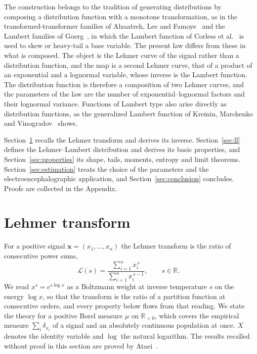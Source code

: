 \documentclass[sn-mathphys-num]{sn-jnl}\newcommand{\SNJNL}{}
\theoremstyle{thmstyleone}
\theoremstyle{thmstyletwo}
\theoremstyle{thmstylethree}
\theoremstyle{thmstyleone}
\providecommand{\R}{\mathbb{R}}
\providecommand{\Rpos}{\mathbb{R}_{>0}}
\providecommand{\Leh}{\mathscr{L}}
\providecommand{\xv}{\mathbf{x}}
\begin{document}
	The construction belongs to the tradition of generating
	distributions by composing a distribution function with a monotone
	transformation, as in the transformed-transformer families of
	Alzaatreh, Lee and Famoye~\cite{alzaatreh2013} and the Lambert
	families of Goerg~\cite{goerg2011}, in which the Lambert function
	of Corless et al.~\cite{corless1996} is used to skew or heavy-tail a
	base variable. The present law differs from these in what is composed.
	The object is the Lehmer curve of the signal rather than a
	distribution function, and the map is a second Lehmer curve, that of
	a product of an exponential and a lognormal variable, whose inverse
	is the Lambert function. The distribution function is therefore a
	composition of two Lehmer curves, and the parameters of the law are
	the number of exponential--lognormal factors and their lognormal
	variance. Functions of Lambert type also arise directly as
	distribution functions, as the generalized Lambert function of
	Kreinin, Marchenko and Vinogradov~\cite{kreinin2026} shows.
	
	Section~\ref{sec:lehmer} recalls the Lehmer transform and derives
	its inverse. Section~\ref{sec:ll} defines the Lehmer--Lambert
	distribution and derives its basic properties, and
	Section~\ref{sec:properties} its shape, tails, moments, entropy and
	limit theorems. Section~\ref{sec:estimation} treats the choice of the
	parameters and the electroencephalographic application, and
	Section~\ref{sec:conclusion} concludes. Proofs are collected in the
	Appendix.
	
	\newpage
	\section{Lehmer transform}\label{sec:lehmer}
	
	For a positive signal $\xv=(x_1,\dots,x_n)$ the Lehmer
	transform is the ratio of consecutive power sums,
	\begin{equation}\label{eq:defdata}
		\Leh(s)=\frac{\sum_{i=1}^{n}x_i^{\,s}}{\sum_{i=1}^{n}x_i^{\,s-1}},
		\qquad s\in\R .
	\end{equation}
	We read $x^{s}=e^{s\log x}$ as a Boltzmann weight at inverse
	temperature $s$ on the energy $\log x$, so that the transform is the ratio of a partition function at
	consecutive orders, and every
	property below flows from that reading. We state the theory for a
	positive Borel measure $\mu$ on $\Rpos$, which covers the empirical
	measure $\sum_i\delta_{x_i}$ of a signal and an absolutely
	continuous population at once. $X$ denotes the identity variable and
	$\log$ the natural logarithm. The results recalled without proof in
	this section are proved by Ataei~\cite{ataei2026}.
	
\end{document}
